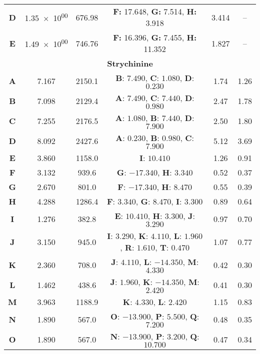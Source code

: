 \begin{longtable}[h!]{c c c c c c}
\textbf{D} & \num{1.35e+00} & 676.98 & \textbf{F:} 17.648, \textbf{G:} 7.514, \textbf{H:} 3.918 & 3.414 & --\\

\textbf{E} & \num{1.49e+00} & 746.76 & \textbf{F:} 16.396, \textbf{G:} 7.455, \textbf{H:} 11.352 & 1.827 & --\\

\hline
\multicolumn{6}{c}{\textbf{Strychinine}}\\
\hline
\textbf{A} & 7.167 & 2150.1 & \textbf{B}: $7.490$, \textbf{C}: $1.080$, \textbf{D}: $0.230$& 1.74& 1.26 \\
\textbf{B} & 7.098 & 2129.4 & \textbf{A}: $7.490$, \textbf{C}: $7.440$, \textbf{D}: $0.980$& 2.47& 1.78 \\
\textbf{C} & 7.255 & 2176.5 & \textbf{A}: $1.080$, \textbf{B}: $7.440$, \textbf{D}: $7.900$& 2.50& 1.80 \\
\textbf{D} & 8.092 & 2427.6 & \textbf{A}: $0.230$, \textbf{B}: $0.980$, \textbf{C}: $7.900$& 5.12& 3.69 \\
\textbf{E} & 3.860 & 1158.0 & \textbf{I}: $10.410$& 1.26& 0.91 \\
\textbf{F} & 3.132 & 939.6 & \textbf{G}: $-17.340$, \textbf{H}: $3.340$& 0.52& 0.37 \\
\textbf{G} & 2.670 & 801.0 & \textbf{F}: $-17.340$, \textbf{H}: $8.470$& 0.55& 0.39 \\
\textbf{H} & 4.288 & 1286.4 & \textbf{F}: $3.340$, \textbf{G}: $8.470$, \textbf{I}: $3.300$& 0.89& 0.64 \\
\textbf{I} & 1.276 & 382.8 & \textbf{E}: $10.410$, \textbf{H}: $3.300$, \textbf{J}: $3.290$& 0.97& 0.70 \\
\textbf{J} & 3.150 & 945.0 & \textbf{I}: $3.290$, \textbf{K}: $4.110$, \textbf{L}: $1.960$, \textbf{R}: $1.610$, \textbf{T}: $0.470$& 1.07& 0.77 \\
\textbf{K} & 2.360 & 708.0 & \textbf{J}: $4.110$, \textbf{L}: $-14.350$, \textbf{M}: $4.330$& 0.42& 0.30 \\
\textbf{L} & 1.462 & 438.6 & \textbf{J}: $1.960$, \textbf{K}: $-14.350$, \textbf{M}: $2.420$& 0.41& 0.30 \\
\textbf{M} & 3.963 & 1188.9 & \textbf{K}: $4.330$, \textbf{L}: $2.420$& 1.15& 0.83 \\
\textbf{N} & 1.890 & 567.0 & \textbf{O}: $-13.900$, \textbf{P}: $5.500$, \textbf{Q}: $7.200$& 0.48& 0.35 \\
\textbf{O} & 1.890 & 567.0 & \textbf{N}: $-13.900$, \textbf{P}: $3.200$, \textbf{Q}: $10.700$& 0.47& 0.34 \\

\end{longtable}
